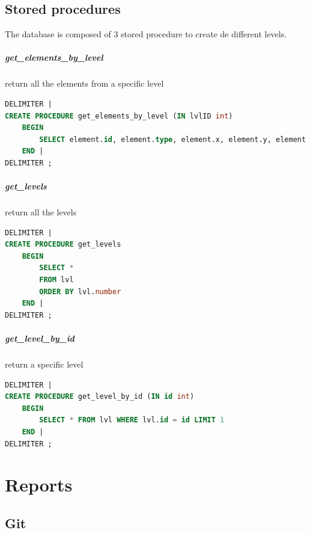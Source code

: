 \documentclass{report}
\begin{document}
\section{Stored procedures}

The database is composed of 3 stored procedure to create de different levels.

\paragraph{get\_elements\_by\_level} return all the elements from a specific level

\begin{lstlisting}[language=SQL]
DELIMITER |
CREATE PROCEDURE get_elements_by_level (IN lvlID int)
	BEGIN
		SELECT element.id, element.type, element.x, element.y, element.direction, element.lvl_number FROM element WHERE lvl_number = lvlID
	END |
DELIMITER ;
\end{lstlisting}

\paragraph{get\_levels} return all the levels

\begin{lstlisting}[language=SQL]
DELIMITER |                                                      
CREATE PROCEDURE get_levels
	BEGIN
		SELECT *
		FROM lvl
		ORDER BY lvl.number
	END |
DELIMITER ;
\end{lstlisting}

\paragraph{get\_level\_by\_id} return a specific level

\begin{lstlisting}[language=SQL]
DELIMITER |                                                      
CREATE PROCEDURE get_level_by_id (IN id int)
	BEGIN
		SELECT * FROM lvl WHERE lvl.id = id LIMIT 1
	END |
DELIMITER ;
\end{lstlisting}

\chapter{Reports}

\section{Git}
\end{document}
